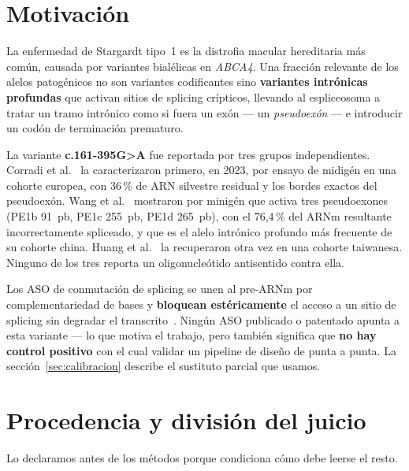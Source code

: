 \documentclass[11pt,a4paper]{article}
\begin{document}
\clearpage

\tableofcontents
\clearpage

\section{Motivación}

La enfermedad de Stargardt tipo~1 es la distrofia macular hereditaria más común, causada por
variantes bialélicas en \emph{ABCA4}. Una fracción relevante de los alelos patogénicos no son
variantes codificantes sino \textbf{variantes intrónicas profundas} que activan sitios de splicing
crípticos, llevando al espliceosoma a tratar un tramo intrónico como si fuera un exón --- un
\emph{pseudoexón} --- e introducir un codón de terminación prematuro.

La variante \textbf{c.161-395G>A} fue reportada por tres grupos independientes. Corradi et
al.~\cite{corradi2023} la caracterizaron primero, en 2023, por ensayo de midigén en una cohorte
europea, con 36\,\% de ARN silvestre residual y los bordes exactos del pseudoexón. Wang et
al.~\cite{wang2025} mostraron por minigén que activa tres pseudoexones (PE1b 91~pb, PE1c 255~pb,
PE1d 265~pb), con el 76,4\,\% del ARNm resultante incorrectamente spliceado, y que es el alelo
intrónico profundo más frecuente de su cohorte china. Huang et al.~\cite{huang2025} la recuperaron
otra vez en una cohorte taiwanesa. Ninguno de los tres reporta un oligonucleótido antisentido contra
ella.

Los ASO de conmutación de splicing se unen al pre-ARNm por complementariedad de bases y
\textbf{bloquean estéricamente} el acceso a un sitio de splicing sin degradar el
transcrito~\cite{dhuri2020}. Ningún ASO publicado o patentado apunta a esta variante --- lo que
motiva el trabajo, pero también significa que \textbf{no hay control positivo} con el cual validar
un pipeline de diseño de punta a punta. La sección~\ref{sec:calibracion} describe el sustituto
parcial que usamos.

\section{Procedencia y división del juicio}
\label{sec:procedencia}

Lo declaramos antes de los métodos porque condiciona cómo debe leerse el resto.
\end{document}

